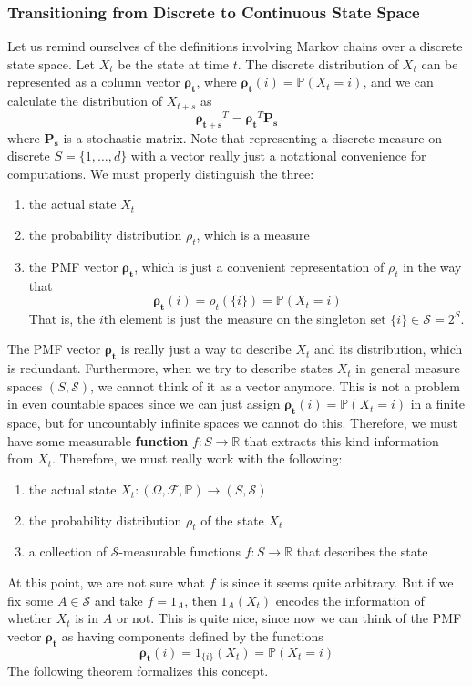 \documentclass{article}
\theoremstyle{definition}
\theoremstyle{remark}
\theoremstyle{definition}
\begin{document}
\subsubsection{Transitioning from Discrete to Continuous State Space}

Let us remind ourselves of the definitions involving Markov chains over a discrete state space. Let $X_t$ be the state at time $t$. The discrete distribution of $X_t$ can be represented as a column vector $\boldsymbol{\rho_t}$, where $\boldsymbol{\rho_t} (i) = \mathbb{P}(X_t = i)$, and we can calculate the distribution of $X_{t + s}$ as 
\[\boldsymbol{\rho_{t + s}}^T = \boldsymbol{\rho_{t}}^T \boldsymbol{P_s} \]
where $\boldsymbol{P_s}$ is a stochastic matrix. Note that representing a discrete measure on discrete $S = \{1, \ldots, d\}$ with a vector really just a notational convenience for computations. We must properly distinguish the three: 
\begin{enumerate}
    \item the actual state $X_t$ 
    \item the probability distribution $\rho_t$, which is a measure 
    \item the PMF vector $\boldsymbol{\rho_t}$, which is just a convenient representation of $\rho_t$ in the way that 
    \[\boldsymbol{\rho_t} (i) = \rho_t (\{i\}) = \mathbb{P}(X_t = i)\]
    That is, the $i$th element is just the measure on the singleton set $\{i\} \in \mathcal{S} = 2^S$. 
\end{enumerate}
The PMF vector $\boldsymbol{\rho_t}$ is really just a way to describe $X_t$ and its distribution, which is redundant. Furthermore, when we try to describe states $X_t$ in general measure spaces $(S, \mathcal{S})$, we cannot think of it as a vector anymore. This is not a problem in even countable spaces since we can just assign $\boldsymbol{\rho_t} (i) = \mathbb{P}(X_t = i)$ in a finite space, but for uncountably infinite spaces we cannot do this. Therefore, we must have some measurable \textbf{function} $f: S \rightarrow \mathbb{R}$ that extracts this kind information from $X_{t}$. Therefore, we must really work with the following: 
\begin{enumerate}
    \item the actual state $X_t: (\Omega, \mathcal{F}, \mathbb{P}) \longrightarrow (S, \mathcal{S})$ 
    \item the probability distribution $\rho_t$ of the state $X_t$ 
    \item a collection of $\mathcal{S}$-measurable functions $f: S \longrightarrow \mathbb{R}$ that describes the state 
\end{enumerate}
At this point, we are not sure what $f$ is since it seems quite arbitrary. But if we fix some $A \in \mathcal{S}$ and take $f = 1_A$, then $1_A (X_t)$ encodes the information of whether $X_t$ is in $A$ or not. This is quite nice, since now we can think of the PMF vector $\boldsymbol{\rho_t}$ as having components defined by the functions 
\[\boldsymbol{\rho_t} (i) = 1_{\{i\}} (X_t) = \mathbb{P}(X_t = i)\]
The following theorem formalizes this concept. 
\end{document}
